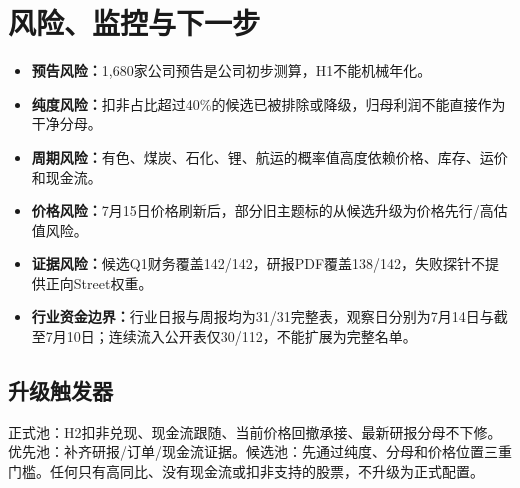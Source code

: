 \chapter{风险、监控与下一步}

\begin{itemize}
\item \textbf{预告风险：}1,680家公司预告是公司初步测算，H1不能机械年化。
\item \textbf{纯度风险：}扣非占比超过40\%的候选已被排除或降级，归母利润不能直接作为干净分母。
\item \textbf{周期风险：}有色、煤炭、石化、锂、航运的概率值高度依赖价格、库存、运价和现金流。
\item \textbf{价格风险：}7月15日价格刷新后，部分旧主题标的从候选升级为价格先行/高估值风险。
\item \textbf{证据风险：}候选Q1财务覆盖142/142，研报PDF覆盖138/142，失败探针不提供正向Street权重。
\item \textbf{行业资金边界：}行业日报与周报均为31/31完整表，观察日分别为7月14日与截至7月10日；连续流入公开表仅30/112，不能扩展为完整名单。
\end{itemize}

\section{升级触发器}

正式池：H2扣非兑现、现金流跟随、当前价格回撤承接、最新研报分母不下修。优先池：补齐研报/订单/现金流证据。候选池：先通过纯度、分母和价格位置三重门槛。任何只有高同比、没有现金流或扣非支持的股票，不升级为正式配置。
